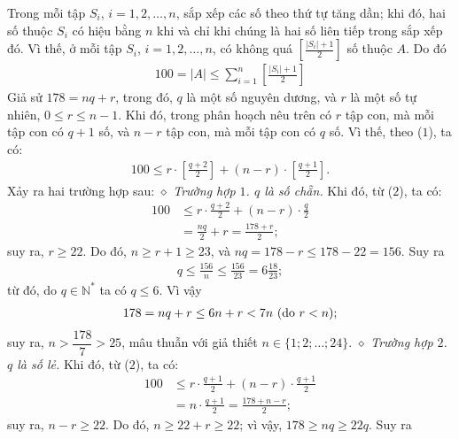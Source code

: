 \begin{multicols}{2}
	\vskip 0.05cm
	Trong mỗi tập  $S_i$, $i = 1, 2, \ldots, n$, sắp xếp các số theo thứ tự tăng dần; khi đó, hai số thuộc $S_i$  có hiệu bằng $n$ khi và chỉ khi chúng là hai số liên tiếp trong sắp xếp đó. Vì thế, ở mỗi tập  $S_i$, $i = 1, 2, \ldots, n$, có không quá $\left[ {\frac{{\left| {{S_i}} \right| + 1}}{2}} \right]$  số thuộc $A$. Do đó
	\begin{align*}
		100 = |A| \le \sum\limits_{i = 1}^n {\left[ {\frac{{\left| {{S_i}} \right| + 1}}{2}} \right]} \tag{$1$}
	\end{align*}
	Giả sử $178 = nq + r$, trong đó, $q$ là một số nguyên dương, và $r$ là một số tự nhiên, \linebreak$0 \le r \le n - 1$. Khi đó, trong phân hoạch nêu trên có $r$ tập con, mà mỗi tập con có $q + 1$ số, và $n - r$ tập con, mà mỗi tập con có $q$ số. Vì thế, theo ($1$), ta có:
	\begin{align*}
		100 \!\le\! r \!\cdot\! \left[ {\frac{{q \!+\! 2}}{2}} \right] \!+\! \left( {n \!-\! r} \right) \!\cdot\! \left[ {\frac{{q \!+\! 1}}{2}}\right]\!. \tag{$2$}
	\end{align*}
	Xảy ra hai trường hợp sau:
	\vskip 0.05cm
	$\diamond$ \textit{Trường hợp $1$. $q$ là số chẵn.}
	\vskip 0.05cm
	Khi đó, từ ($2$), ta có:
	\begin{align*}
		100 &\le r \cdot \frac{{q + 2}}{2} + \left( {n - r} \right) \cdot \frac{q}{2}\\
		 &= \frac{{nq}}{2} + r = \frac{{178 + r}}{2};
	\end{align*}
	suy ra, $r \ge 22$. Do đó, $n \ge r + 1 \ge 23$, và $nq = 178 - r \le 178 - 22 = 156$. Suy ra
	\begin{align*}
		q \le \frac{{156}}{n} \le \frac{{156}}{{23}} = 6\frac{{18}}{{23}};
	\end{align*}
	từ đó, do $q \in \mathbb{N^*}$  ta có $q \le 6$. Vì vậy
	\begin{align*}
		178 = nq + r \le 6n + r < 7n   \,\,(\text{\color{black}do }r < n);
	\end{align*}
	suy ra, $n > \dfrac{178}{7} > 25$,  mâu thuẫn với giả thiết $n \in \{1; 2; \ldots; 24\}$.
	\vskip 0.05cm
	$\diamond$ \textit{Trường hợp $2$. $q$ là số lẻ.}
	\vskip 0.05cm
	Khi đó, từ ($2$), ta có:
	\begin{align*}
		100 &\le r \cdot \frac{{q + 1}}{2} + \left( {n - r} \right) \cdot \frac{{q + 1}}{2} \\
		&= n \cdot \frac{{q + 1}}{2} = \frac{{178 + n - r}}{2}; \tag{$3$}
	\end{align*}
	suy ra, $n - r \ge 22$. Do đó, $n \ge 22 + r \ge 22$; vì vậy, $178 \ge nq \ge 22q$. Suy ra

\end{multicols}
